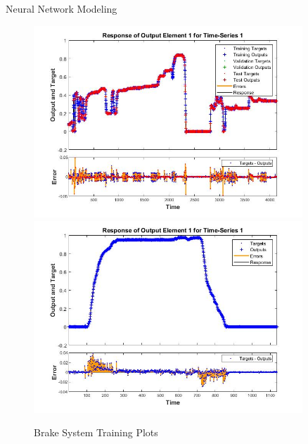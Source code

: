 \documentclass[final]{beamer}
\newlength{\sepwid}
\newlength{\onecolwid}
\begin{document}
\begin{frame}[t]
\begin{columns}[t]
\begin{column}{\onecolwid}
\begin{block}{Neural Network Modeling}
\begin{figure}
    \centering
		{\includegraphics[width=0.48\linewidth]{figs/img/brake_new_neuralNetworkFig}}
		{\includegraphics[width=0.48\linewidth]{figs/img/brake_new_neuralNetworkFigLog2Test}}
	\caption{Brake System Training Plots}
    \label{fig:BrakeSysNeuralNetwork}
\end{figure}


\end{block}



\end{column} %

\begin{column}{\sepwid}\end{column} %

\begin{column}{\onecolwid} %


\end{column}
\end{columns}
\end{frame}
\end{document}

